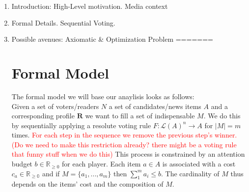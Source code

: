 \documentclass[10pt,a4paper,english]{article}
\begin{document}
\begin{enumerate}
\item Introduction: High-Level motivation. Media context
\item Formal Details. Sequential Voting.
\item Possible avenues: Axiomatic \& Optimization Problem
=======
\section{Formal Model}
The formal model we will base our anaylisis looks as follows:\\
Given a set of voters/readers $N$ a set of candidates/news items $A$ and a corresponding profile $\mathbf{R}$ we want to fill a set of indispensable $M$. We do this by sequentially applying a resolute voting rule $F:\mathcal{L}(A)^n \rightarrow A$ for $|M|=m$ times. \textcolor{red}{For each step in the sequence we remove the previous step's winner. (Do we need to make this restriction already? there might be a voting rule that funny stuff when we do this)} This process is constrained by an attention budget $b\in \mathbb{R}_{\geq 0}$ for each player. Each item $a\in A$ is associated with a cost $c_a\in \mathbb{R_{\geq 0}}$ and if $M=\{a_1,...,a_m\}$ then $\sum_1^m a_i \leq b$. The cardinality of $M$ thus depends on the items' cost and the composition of $M$.


\end{enumerate}
\end{document}
